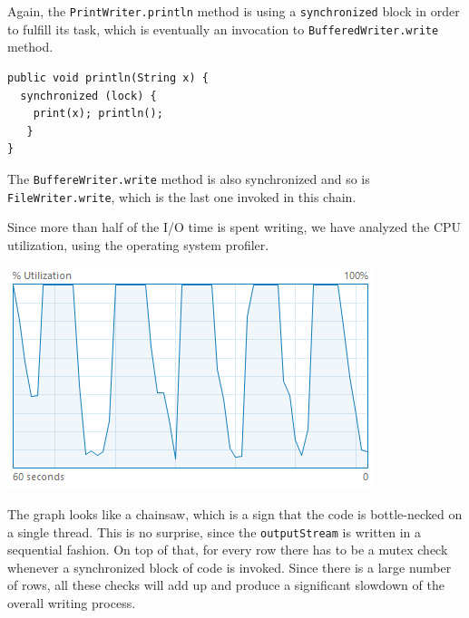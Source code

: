 \documentclass[a4paper,twoside]{article}
\begin{document}
Again, the {\tt PrintWriter.println} method is using a {\tt synchronized} block in order to fulfill its task, which is eventually an invocation to {\tt BufferedWriter.write} method.
\begin{verbatim}
public void println(String x) {
  synchronized (lock) {
    print(x); println();
   }
}
\end{verbatim}
The {\tt BuffereWriter.write} method is also synchronized and so is {\tt FileWriter.write}, which is the last one invoked in this chain.

Since more than half of the I/O time is spent writing, we have analyzed the CPU utilization, using the operating system profiler.
\begin{center}
\includegraphics[scale=0.5]{images/cpu_original.png}
\end{center}
The graph looks like a chainsaw, which is a sign that the code is bottle-necked on a single thread. This is no surprise, since the {\tt outputStream} is written in a sequential fashion.
On top of that, for every row there has to be a mutex check whenever a synchronized block of code is invoked. Since there is a large number of rows, all these checks will add up and produce a significant slowdown of the overall writing process.
\end{document}
